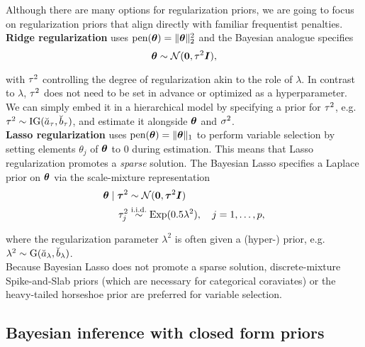 Although there are many options for regularization priors, we are going to focus on regularization priors that align directly with familiar frequentist penalties.\\

\textbf{Ridge regularization} \citep{hoerl_ridge_1970,hoerl_ridge_1970-1} uses $\text{pen}(\bm{\theta}) = \|\bm{\theta}\|_2^2$ and the Bayesian analogue  specifies
\begin{equation}\label{eq:ridge}
    \bm{\theta} \sim \mathcal{N}(\bm{0}, \tau^2 \bm{I}),
\end{equation}

with $\tau^2$ controlling the degree of regularization akin to the role of $\lambda$.
In contrast to $\lambda$, $\tau^2$ does not need to be set in advance or optimized as a hyperparameter.
We can simply embed it in a hierarchical model by specifying a prior for $\tau^2$, e.g.\@ $\tau^2 \sim \text{IG}(\breve{a}_\tau, \breve{b}_\tau)$, and estimate it alongside $\bm{\theta}$ and $\sigma^2$.\\

\textbf{Lasso regularization} \citep{tibshirani_regression_1996} uses $\text{pen}(\bm{\theta}) = \|\bm{\theta}\|_1$ to perform variable selection by setting elements $\theta_j$ of $\bm{\theta}$ to $0$ during estimation.
This means that Lasso regularization promotes a \textit{sparse} solution.
The Bayesian Lasso specifies a Laplace prior on $\bm{\theta}$ via the scale-mixture representation \citep{park_bayesian_2008}
\begin{equation}\label{eq:lasso}
    \begin{aligned}
        \bm{\theta} \mid \bm{\tau}^2 &\sim \mathcal{N}(\bm{0}, \bm{\tau}^2 \bm{I}) \\
        \tau^2_j &\overset{\text{i.i.d.}}{\sim} \text{Exp}(0.5 \lambda^2), \quad j = 1, \dots, p,
    \end{aligned}
\end{equation}

where the regularization parameter $\lambda^2$ is often given a (hyper-) prior, e.g.\@ $\lambda^2 \sim \text{G}(\breve{a}_\lambda, \breve{b}_\lambda)$.\\

Because Bayesian Lasso does not promote a sparse solution, discrete-mixture Spike-and-Slab priors \citep{mitchell_bayesian_1988} (which are necessary for categorical coraviates) or the heavy-tailed horseshoe prior \citep{carvalho_horseshoe_2010} are preferred for variable selection.

\subsection{Bayesian inference with closed form priors}

